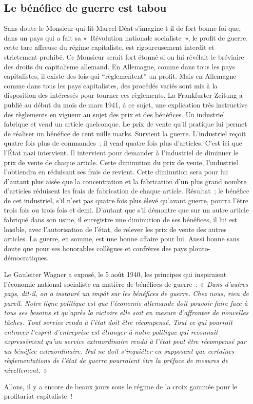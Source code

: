\documentclass[french,twoside]{book} %
\begin{document}
\subsection[Le bénéfice de guerre est tabou]{Le bénéfice de guerre est tabou}
\noindent Sans doute le Monsieur-qui-lit-Marcel-Déat s’imagine-t-il de fort bonne foi que, dans un pays qui a fait sa « Révolution nationale socialiste », le profit de guerre, cette tare affreuse du régime capitaliste, est rigoureusement interdit et strictement prohibé. Ce Monsieur serait fort étonné si on lui révélait le bréviaire des droits du capitalisme allemand. En Allemagne, comme dans tous les pays capitalistes, il existe des lois qui “règlementent” un profit. Mais en Allemagne comme dans tous les pays capitalistes, des procédés variés sont mis à la disposition des intéressés pour tourner ces règlements. La Frankfurter Zeitung a publié au début du mois de mars 1941, à ce sujet, une explication très instructive des règlements en vigueur au sujet des prix et des bénéfices. Un industriel fabrique et vend un article quelconque. Le prix de vente qu’il pratique lui permet de réaliser un bénéfice de cent mille marks. Survient la guerre. L’industriel reçoit quatre fois plus de commandes ; il vend quatre fois plus d’articles. C’est ici que l’État nazi intervient. Il intervient pour demander à l’industriel de diminuer le prix de vente de chaque article. Cette diminution du prix de vente, l’industriel l’obtiendra en réduisant ses frais de revient. Cette diminution sera pour lui d’autant plus aisée que la concentration et la fabrication d’un plus grand nombre d’articles réduisent les frais de fabrication de chaque article. Résultat ; le bénéfice de cet industriel, s’il n’est pas quatre fois plus élevé qu’avant guerre, pourra l’être trois fois ou trois fois et demi. D’autant que s’il démontre que sur un autre article fabriqué dans son usine, il enregistre une diminution de ses bénéfices, il lui est loisible, avec l’autorisation de l’état, de relever les prix de vente des autres articles. La guerre, en somme, est une bonne affaire pour lui. Aussi bonne sans doute que pour ses honorables collègues et confrères des pays plouto-démocratiques.\par
Le Gauleiter Wagner a exposé, le 5 août 1940, les principes qui inspiraient l’économie national-socialiste en matière de bénéfices de guerre : « \emph{Dans d’autres pays, dit-il, on a instauré un impôt sur les bénéfices de guerre. Chez nous, rien de pareil. Notre ligne politique est que l’économie allemande doit pouvoir faire face à tous ses besoins et qu’après la victoire elle soit en mesure d’affronter de nouvelles tâches. Tout service rendu à l’état doit être récompensé. Tout ce qui pourrait entraver l’esprit d’entreprise est étranger à notre politique qui reconnait expressément qu’un service extraordinaire rendu à l’état peut être récompensé par un bénéfice extraordinaire. Nul ne doit s’inquiéter en supposant que certaines règlementations de l’état de guerre pourraient être la préface de mesures de nivellement.} »\par
Allons, il y a encore de beaux jours sous le régime de la croix gammée pour le profitariat capitaliste !
\end{document}
